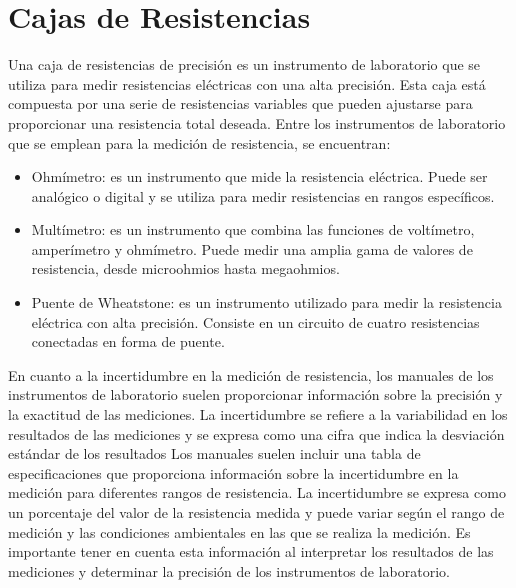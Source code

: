 \documentclass[12pt, letterpaper]{article}
\begin{document}
\section{Cajas de Resistencias}
Una caja de resistencias de precisión es un instrumento de laboratorio que se utiliza para medir resistencias eléctricas con una alta precisión. Esta caja está compuesta por una serie de resistencias variables que pueden ajustarse para proporcionar una resistencia total deseada.
\singlespacing
Entre los instrumentos de laboratorio que se emplean para la medición de resistencia, se encuentran:
\begin{itemize}
    \item Ohmímetro: es un instrumento que mide la resistencia eléctrica. Puede ser analógico o digital y se utiliza para medir resistencias en rangos específicos.
    \item Multímetro: es un instrumento que combina las funciones de voltímetro, amperímetro y ohmímetro. Puede medir una amplia gama de valores de resistencia, desde  microohmios hasta megaohmios.
    \item Puente de Wheatstone: es un instrumento utilizado para medir la resistencia eléctrica con alta precisión. Consiste en un circuito de cuatro resistencias conectadas en forma de puente.
\end{itemize}
\singlespacing
En cuanto a la incertidumbre en la medición de resistencia, los manuales de los instrumentos de laboratorio suelen proporcionar información sobre la precisión y la exactitud de las mediciones. La incertidumbre se refiere a la variabilidad en los resultados de las mediciones y se expresa como una cifra que indica la desviación estándar de los resultados
\singlespacing
Los manuales suelen incluir una tabla de especificaciones que proporciona información sobre la incertidumbre en la medición para diferentes rangos de resistencia. La incertidumbre se expresa como un porcentaje del valor de la resistencia medida y puede variar según el rango de medición y las condiciones ambientales en las que se realiza la medición. Es importante tener en cuenta esta información al interpretar los resultados de las mediciones y determinar la precisión de los instrumentos de laboratorio.
\end{document}
